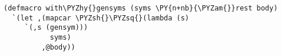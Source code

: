 \begin{Verbatim}[commandchars=\\\{\}]
(defmacro with\PYZhy{}gensyms (syms \PY{n+nb}{\PYZam{}}rest body)
  `(let ,(mapcar \PYZsh{}\PYZsq{}(lambda (s)
     `(,s (gensym)))
           syms)
         ,@body))
\end{Verbatim}
